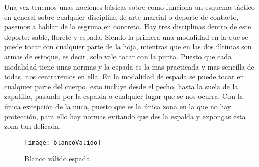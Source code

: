 Una vez tenemos unas nociones básicas sobre como funciona un esquema táctico en general sobre cualquier
 disciplina de arte marcial o deporte de contacto, pasemos a hablar de la esgrima en concreto.
 Hay tres disciplinas dentro de este deporte: sable, florete y espada. Siendo la primera una modalidad
 en la que se puede tocar con cualquier parte de la hoja, mientras que en las dos últimas son armas de
 estoque, es decir, solo vale tocar con la punta. Puesto que cada modalidad tiene unas normas y la espada
 es la mas practicada y mas sencilla de todas, nos centraremos en ella. En la modalidad de espada se puede
 tocar en cualquier parte del cuerpo, esto incluye desde el pecho, hasta la suela de la zapatilla, pasando
 por la espalda o cualquier lugar que se nos ocurra. Con la única excepción de la nuca, puesto que es la única
 zona en la que no hay protección, para ello hay normas evitando que des la espalda y expongas esta zona
 tan delicada.

\begin{figure}[htb]
	\centering
	\texttt{[image: blancoValido]}
	\caption[Blanco válido espada]{Blanco válido espada}
	\label{fig:blancoValido}
\end{figure}

